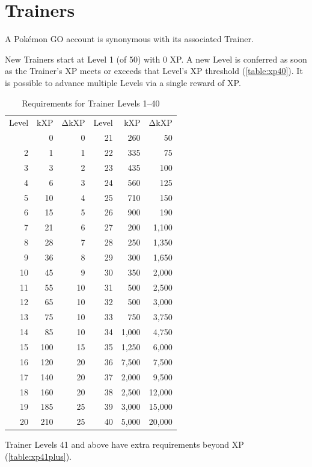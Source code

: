 \chapter{Trainers}
A Pokémon GO account is synonymous with its associated Trainer.

New Trainers start at Level 1 (of 50) with 0 XP\@.
A new Level is conferred as soon as the Trainer's XP meets or exceeds
  that Level's XP threshold (\autoref{table:xp40}).
It is possible to advance multiple Levels via a single reward of XP\@.
\begin{table}[hb]
\begin{center}
\begin{tabular}{r r r|r r r}
  Level & kXP & ΔkXP & Level & kXP & ΔkXP \\
\Midrule
1 & 0 & 0 & 21 & 260 & 50 \\
2 & 1 & 1 & 22 & 335 & 75 \\
3 & 3 & 2 & 23 & 435 & 100 \\
4 & 6 & 3 & 24 & 560 & 125 \\
5 & 10 & 4 & 25 & 710 & 150 \\
6 & 15 & 5 & 26 & 900 & 190 \\
7 & 21 & 6 & 27 & 200 & 1,100 \\
8 & 28 & 7 & 28 & 250 & 1,350 \\
9 & 36 & 8 & 29 & 300 & 1,650 \\
10 & 45 & 9 & 30 & 350 & 2,000 \\
11 & 55 & 10 & 31 & 500 & 2,500 \\
12 & 65 & 10 & 32 & 500 & 3,000 \\
13 & 75 & 10 & 33 & 750 & 3,750 \\
14 & 85 & 10 & 34 & 1,000 & 4,750 \\
15 & 100 & 15 & 35 & 1,250 & 6,000 \\
16 & 120 & 20 & 36 & 7,500 & 7,500 \\
17 & 140 & 20 & 37 & 2,000 & 9,500 \\
18 & 160 & 20 & 38 & 2,500 & 12,000 \\
19 & 185 & 25 & 39 & 3,000 & 15,000 \\
20 & 210 & 25 & 40 & 5,000 & 20,000 \\
\end{tabular}
\caption{Requirements for Trainer Levels 1--40}
\label{table:xp40}
\end{center}
\end{table}
Trainer Levels 41 and above have extra requirements beyond XP (\autoref{table:xp41plus}).
